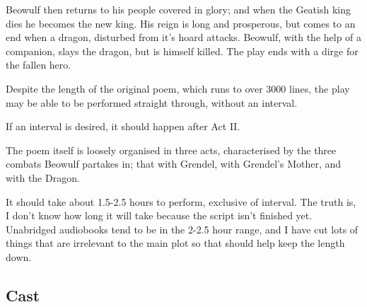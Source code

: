 \documentclass[a4paper]{article}
\begin{document}
Beowulf then returns to his people covered in glory; and when the Geatish king dies 
he becomes the new king. His reign is long and prosperous, but comes to an end when
a dragon, disturbed from it's hoard attacks. Beowulf, with the help of a companion, 
slays the dragon, but is himself killed. The play ends with a dirge for the fallen hero.
\newline

Despite the length of the original poem, which runs to over 3000 lines, the play
may be able to be performed straight through, without an interval.

If an interval is desired, it should happen after Act II.

The poem itself is loosely organised in three acts, characterised by the three 
combats Beowulf partakes in; that with Grendel, with Grendel's Mother, and with the Dragon.

It should take about 1.5-2.5 hours to perform, exclusive of interval. The truth is,
I don't know how long it will take because the script isn't finished yet. 
Unabridged audiobooks tend to be in the 2-2.5 hour range, and I have cut lots of 
things that are irrelevant to the main plot so that should help keep the length down.

\newpage

\subsection{Cast}%
\end{document}
